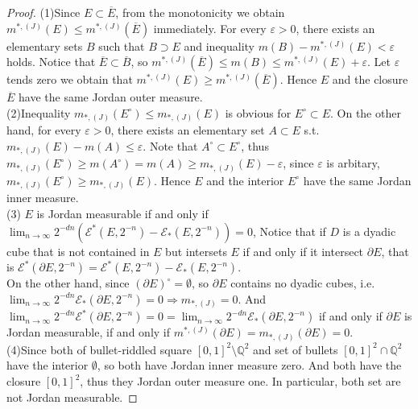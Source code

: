 \documentclass{article}
\begin{document}
\setcounter{ex}{17}
\begin{ex}\end{ex}
\begin{proof}
(1)Since $E \subset \overline{E}$, from the monotonicity we obtain $m^{*,(J)}(E) \leq m^{*,(J)}(\overline{E})$ 
immediately. For every $\varepsilon > 0$, there exists an elementary sets $B$ such that $B \supset E$ and inequality
$m(B) - m^{*, (J)}(E) < \varepsilon$ holds. Notice that $\overline{E} \subset \overline{B}$, so 
$m^{*, (J)}(\overline{E}) \leq m(B) \leq m^{*, (J)}(E) + \varepsilon$. Let $\varepsilon$ tends zero we obtain that
$m^{*, (J)}(E) \geq m^{*, (J)}(\overline{E})$. Hence $E$ and the closure $\overline{E}$ have the same Jordan outer
measure.\\
(2)Inequality $m_{*,(J)}(E^{\circ}) \leq m_{*,(J)}(E)$ is obvious for $E^{\circ} \subset E$. On the other hand, 
for every $\varepsilon > 0$, there exists an elementary set $A \subset E$ s.t. $m_{*,(J)}(E) - m(A) \leq \varepsilon$.
Note that $A^{\circ} \subset E^{\circ}$, thus $m_{*,(J)}(E^{\circ}) \geq m(A^{\circ}) = m(A) \geq m_{*,(J)}(E) - \varepsilon$,
since $\varepsilon$ is arbitary, $m_{*,(J)}(E^{\circ}) \geq m_{*,(J)}(E)$. Hence $E$ and the interior $E^\circ$ have
the same Jordan inner measure.\\
(3) $E$ is Jordan measurable if and only if $\lim_{n \to \infty} 2^{-dn}(\mathcal{E}^*(E, 2^{-n}) - \mathcal{E}_*(E, 2^{-n})) = 0$,
Notice that if $D$ is a dyadic cube that is not contained in $E$ but intersets $E$ if and only if it intersect $\partial E$,
that is $\mathcal{E}^*(\partial E, 2^{-n}) = \mathcal{E}^*(E, 2^{-n}) - \mathcal{E}_*(E, 2^{-n})$.\\
On the other hand, since $(\partial E)^\circ = \emptyset$, so $\partial E$ contains no dyadic cubes, i.e. 
$\lim_{n \to \infty} 2^{-dn}\mathcal{E}_*(\partial E, 2^{-n}) = 0 \Rightarrow m_{*, (J)} = 0$. And 
$\lim_{n \to \infty} 2^{-dn}\mathcal{E}^*(\partial E, 2^{-n}) = 0 = \lim_{n \to \infty} 2^{-dn}\mathcal{E}_*(\partial E, 2^{-n})$
if and only if $\partial E$ is Jordan measurable, if and only if $m^{*, (J)}(\partial E) = m_{*, (J)}(\partial E) = 0$.\\
(4)Since both of bullet-riddled square $[0, 1]^2 \setminus \mathbb{Q}^2$ and set of bullets $[0, 1]^2 \cap \mathbb{Q}^2$
have the interior $\emptyset$, so both have Jordan inner measure zero. And both have the closure $[0, 1]^2$, thus
they Jordan outer measure one. In particular, both set are not Jordan measurable.
\end{proof}
\end{document}
